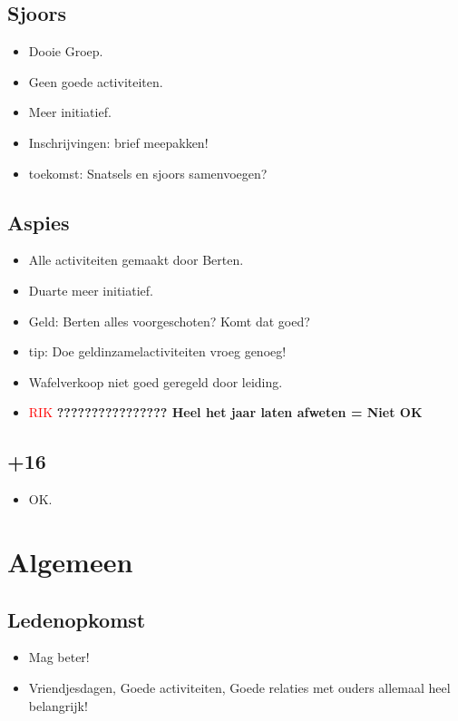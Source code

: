 \documentclass[pdftex,12pt,a4paper,english,titlepage]{article}
\begin{document}
\subsection{Sjoors}
\begin{itemize}
	\item Dooie Groep.
	\item Geen goede activiteiten.
	\item Meer initiatief.
	\item Inschrijvingen: brief meepakken!
	\item toekomst: Snatsels en sjoors samenvoegen?
\end{itemize}

\subsection{Aspies}
\begin{itemize}
	\item Alle activiteiten gemaakt door Berten.
	\item Duarte meer initiatief.
	\item Geld: Berten alles voorgeschoten? Komt dat goed?
	\item tip: Doe geldinzamelactiviteiten vroeg genoeg!
	\item Wafelverkoop niet goed geregeld door leiding.
	\item \textcolor{red}{RIK} \textbf{???????????????? Heel het jaar laten afweten = Niet OK}
\end{itemize}

\subsection{+16}
\begin{itemize}
	\item OK.
\end{itemize}

\section{Algemeen}

\subsection{Ledenopkomst}
\begin{itemize}
	\item Mag beter!
	\item Vriendjesdagen, Goede activiteiten, Goede relaties met ouders allemaal heel belangrijk!
\end{itemize}
\end{document}
